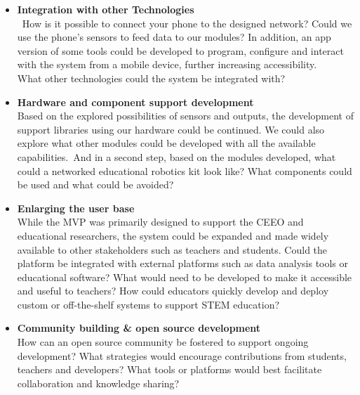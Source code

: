 \begin{itemize}
    \item \textbf{Integration with other Technologies}\\\
    How is it possible to connect your phone to the designed network? Could we use the phone's sensors to feed data to our modules? In addition, an app version of some tools could be developed to program, configure and interact with the system from a mobile device, further increasing accessibility.\\
    What other technologies could the system be integrated with?
    
    \item \textbf{Hardware and component support development}\\
    Based on the explored possibilities of sensors and outputs, the development of support libraries using our hardware could be continued. We could also explore what other modules could be developed with all the available capabilities.\
    And in a second step, based on the modules developed, what could a networked educational robotics kit look like? What components could be used and what could be avoided? 
    
    \item \textbf{Enlarging the user base}\\
    While the MVP was primarily designed to support the CEEO and educational researchers, the system could be expanded and made widely available to other stakeholders such as teachers and students. Could the platform be integrated with external platforms such as data analysis tools or educational software? What would need to be developed to make it accessible and useful to teachers? How could educators quickly develop and deploy custom or off-the-shelf systems to support STEM education?
    
    \item \textbf{Community building \& open source development}\\
    How can an open source community be fostered to support ongoing development? What strategies would encourage contributions from students, teachers and developers? What tools or platforms would best facilitate collaboration and knowledge sharing? 
\end{itemize}


